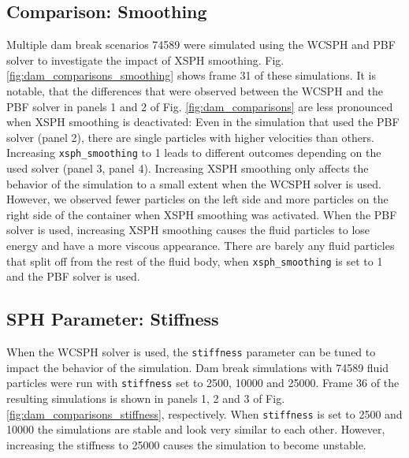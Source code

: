 \documentclass[11pt, letterpaper, twocolumn]{article}
\begin{document}
\subsection{Comparison: Smoothing}
\label{subsec:comparison_smoothing}
Multiple dam break scenarios 74589 were simulated using the WCSPH and PBF solver to investigate the impact of XSPH smoothing. Fig. \ref{fig:dam_comparisons_smoothing} shows frame 31 of these simulations. It is notable, that the differences that were observed between the WCSPH and the PBF solver in panels 1 and 2 of Fig. \ref{fig:dam_comparisons} are less pronounced when XSPH smoothing
is deactivated: Even in the simulation that used the PBF solver (panel 2), there are single particles with higher velocities than others. Increasing \texttt{xsph\_smoothing} to 1 leads to different outcomes depending on the used solver (panel 3, panel 4). Increasing XSPH smoothing only affects the behavior of the simulation to a small extent when the WCSPH solver is used. 
However, we observed fewer particles on the left side and more particles on the right side of the container when XSPH smoothing was activated. When the PBF solver is used, increasing XSPH smoothing causes the fluid particles to lose energy and have a more viscous appearance. There are barely any fluid particles that split off from the rest of the fluid body, when \texttt{xsph\_smoothing} is set to 1 and the PBF solver is used.   

\subsection{SPH Parameter: Stiffness}
\label{subsec:sph_param_stiffness}
When the WCSPH solver is used, the \texttt{stiffness} parameter can be tuned to impact the behavior of the simulation. Dam break simulations with 74589 fluid particles were run with \texttt{stiffness} set to 2500, 10000 and 25000. Frame 36 of the resulting simulations is shown in panels 1, 2 and 3 of Fig. \ref{fig:dam_comparisons_stiffness}, respectively. When \texttt{stiffness} is set to 2500 and 10000
the simulations are stable and look very similar to each other. However, increasing the stiffness to 25000 causes the simulation to become unstable.

\end{document}
